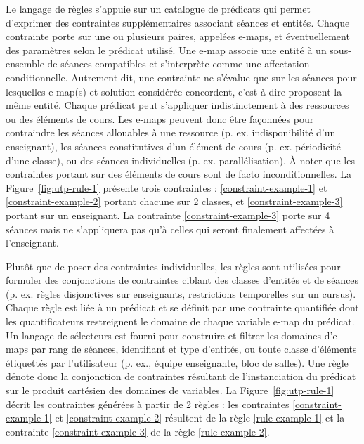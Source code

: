 Le langage de règles s'appuie sur un catalogue de prédicats qui permet d'exprimer des contraintes supplémentaires associant séances et entités.
Chaque contrainte porte sur une ou plusieurs paires, appelées e-maps, et éventuellement des paramètres selon le prédicat utilisé.
Une e-map associe une entité à un sous-ensemble de séances compatibles
et s'interprète comme une affectation conditionnelle. 
Autrement dit, 
une contrainte ne s'évalue que sur les séances pour lesquelles e-map(s) et solution considérée concordent, c'est-à-dire proposent la même entité. 
Chaque prédicat peut s'appliquer indistinctement à des ressources ou des éléments de cours.
Les e-maps peuvent donc être façonnées pour contraindre les séances allouables à une ressource (p. ex. indisponibilité d'un enseignant), les séances constitutives d'un élément de cours (p. ex. périodicité d'une classe), ou des séances individuelles (p. ex. parallélisation).
À noter que les contraintes portant sur des éléments de cours sont
de facto inconditionnelles.
La Figure~\ref{fig:utp-rule-1} présente trois contraintes : \ref{constraint-example-1} et \ref{constraint-example-2} portant chacune sur 2 classes, et \ref{constraint-example-3} portant sur un enseignant.
La contrainte \ref{constraint-example-3} porte sur 4 séances mais ne s'appliquera pas qu'à celles qui seront finalement affectées à l'enseignant.

Plutôt que de poser des contraintes individuelles, les règles sont utilisées pour formuler des conjonctions de contraintes ciblant des classes d'entités et de séances (p. ex. règles disjonctives sur enseignants, restrictions temporelles sur un cursus).
Chaque règle est liée à un prédicat et se définit par une contrainte quantifiée dont les quantificateurs restreignent le domaine de chaque variable e-map du prédicat.
Un langage de sélecteurs est fourni pour construire et filtrer les domaines d'e-maps par rang de séances, identifiant et type d'entités, ou toute classe d'éléments étiquettés par l'utilisateur (p. ex., équipe enseignante, bloc de salles).
Une règle dénote donc la conjonction de contraintes résultant de l'instanciation du prédicat sur le produit cartésien des domaines de variables.
La Figure~\ref{fig:utp-rule-1} décrit les contraintes générées à partir de 2 règles : 
les contraintes \ref{constraint-example-1} et \ref{constraint-example-2} résultent de la règle \ref{rule-example-1} et la contrainte \ref{constraint-example-3} de la règle \ref{rule-example-2}.

